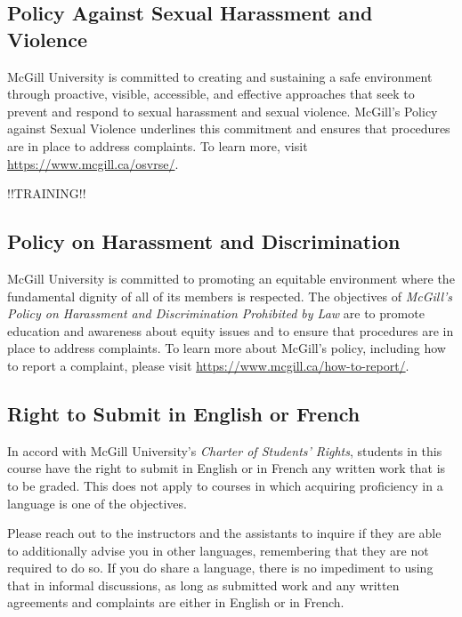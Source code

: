 \documentclass{article}
\begin{document}
\newpage

\subsection{Policy Against Sexual Harassment and Violence}

McGill University is committed to creating and sustaining a safe
environment through proactive, visible, accessible, and effective
approaches that seek to prevent and respond to sexual harassment and
sexual violence. McGill's Policy against Sexual Violence underlines
this commitment and ensures that procedures are in place to address
complaints. To learn more, visit \url{https://www.mcgill.ca/osvrse/}.

!!TRAINING!!

\subsection{Policy on Harassment and Discrimination}

McGill University is committed to promoting an equitable environment
where the fundamental dignity of all of its members is respected. The
objectives of {\em McGill's Policy on Harassment and Discrimination
Prohibited by Law} are to promote education and awareness about equity
issues and to ensure that procedures are in place to address
complaints. To learn more about McGill's policy, including how to
report a complaint, please visit
\url{https://www.mcgill.ca/how-to-report/}.

\subsection{Right to Submit in English or French}

In accord with McGill University's {\em Charter of Students' Rights},
students in this course have the right to submit in English or in
French any written work that is to be graded. This does not apply to
courses in which acquiring proficiency in a language is one of the
objectives.

Please reach out to the instructors and the assistants to inquire if
they are able to additionally advise you in other languages,
remembering that they are not required to do so. If you do share a
language, there is no impediment to using that in informal
discussions, as long as submitted work and any written agreements and
complaints are either in English or in French.

\newpage
\end{document}
